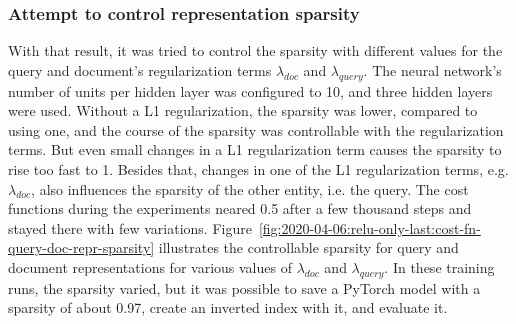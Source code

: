 \subsubsection*{Attempt to control representation sparsity}
With that result, it was tried to control the sparsity with different values for 
    the query and document's regularization terms $\lambda_{doc}$ and $\lambda_{query}$.
The neural network's number of units per hidden layer was configured to 10, and three 
    hidden layers were used.
Without a L1 regularization, the sparsity was lower, compared to using one,
    and the course of the sparsity was controllable with the regularization terms.
But even small changes in a L1 regularization term causes the sparsity to rise too fast to 1.
Besides that, changes in one of the L1 regularization terms, e.g. $\lambda_{doc}$,
    also influences the sparsity of the other entity, i.e. the query.
The cost functions during the experiments neared 0.5 after a few thousand steps and stayed 
    there with few variations.
Figure~\ref{fig:2020-04-06:relu-only-last:cost-fn-query-doc-repr-sparsity} illustrates 
    the controllable sparsity for query and document representations for various
    values of $\lambda_{doc}$ and $\lambda_{query}$.
In these training runs, the sparsity varied, but it was possible to save a PyTorch model    
    with a sparsity of about 0.97, create an inverted index with it, and evaluate it.

